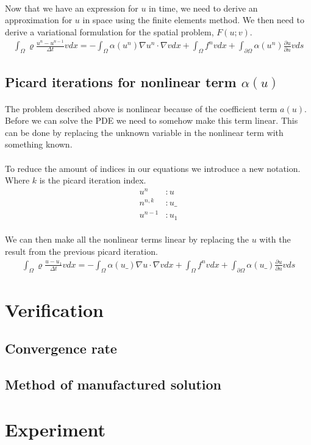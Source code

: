 \documentclass[11pt,a4paper]{article}
\begin{document}
\paragraph*{}
Now that we have an expression for $u$ in time, we need to derive an approximation for $u$ in space using the finite elements method. We then need to derive a variational formulation for the spatial problem,  $F(u;v)$.
\begin{align}
\int_\Omega \varrho\frac{u^n-u^{n-1}}{\Delta t}vdx = -\int_\Omega\alpha(u^n)\nabla u^n \cdot \nabla v dx + \int_\Omega f^n v dx + \int_{\partial\Omega} \alpha(u^{n})\frac{\partial u}{\partial n}vds
\end{align}
\subsection{Picard iterations for nonlinear term $\alpha(u)$}
\paragraph*{}
The problem described above is nonlinear because of the coefficient term $a(u)$. Before we can solve the PDE we need to somehow make this term linear. This can be done by replacing the unknown variable in the nonlinear term with something known.
\paragraph*{}
To reduce the amount of indices in our equations we introduce a new notation. Where $k$ is the picard iteration index.
\begin{align*}
u^n &: u \\
n^{n,k} &: u\_ \\
u^{n-1} &: u_1
\end{align*}
\paragraph*{}
We can then make all the nonlinear terms linear by replacing the $u$ with the result from the previous picard iteration.
\begin{align}
\int_\Omega \varrho\frac{u-u_1}{\Delta t}vdx = -\int_\Omega\alpha(u\_)\nabla u \cdot \nabla v dx + \int_\Omega f^n v dx + \int_{\partial\Omega} \alpha(u\_)\frac{\partial u}{\partial n}vds
\end{align}
\section{Verification}
\subsection{Convergence rate}
\subsection{Method of manufactured solution}
\section{Experiment}
\end{document}
